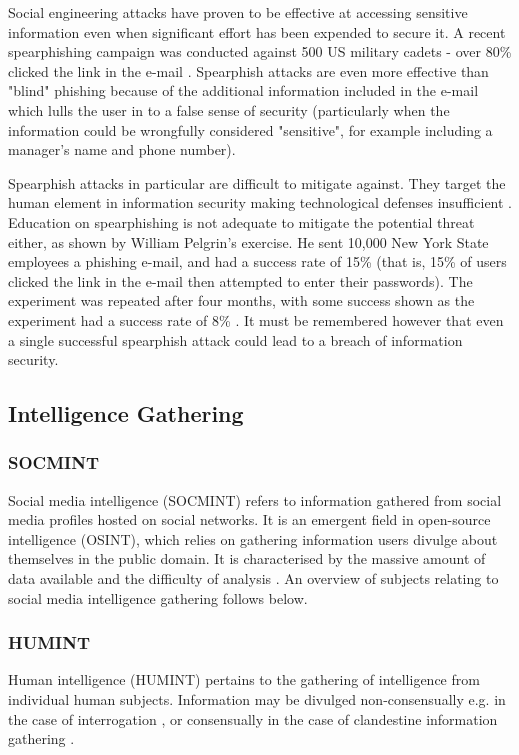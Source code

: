 \documentclass[12pt]{article}
\begin{document}
Social engineering attacks have proven to be effective at accessing sensitive information even when significant effort has been expended to secure it. A recent spearphishing campaign was conducted against 500 US military cadets - over 80\% clicked the link in the e-mail \citep{spearphishing}. Spearphish attacks are even more effective than "blind" phishing because of the additional information included in the e-mail which lulls the user in to a false sense of security (particularly when the information could be wrongfully considered "sensitive", for example including a manager's name and phone number).

Spearphish attacks in particular are difficult to mitigate against. They target the human element in information security making technological defenses insufficient \citep{spearphishing}. Education on spearphishing is not adequate to mitigate the potential threat either, as shown by William Pelgrin's exercise. He sent 10,000 New York State employees a phishing e-mail, and had a success rate of 15\% (that is, 15\% of users clicked the link in the e-mail then attempted to enter their passwords). The experiment was repeated after four months, with some success shown as the experiment had a success rate of 8\% \citep{spearphishingresults}. It must be remembered however that even a single successful spearphish attack could lead to a breach of information security.

\subsection{Intelligence Gathering}
\subsubsection{SOCMINT}
Social media intelligence (SOCMINT) refers to information gathered from social media profiles hosted on social networks. It is an emergent field in open-source intelligence (OSINT), which relies on gathering information users divulge about themselves in the public domain. It is characterised by the massive amount of data available \citep{socmintoverview} and the difficulty of analysis \citep{socmintlitreview}. An overview of subjects relating to social media intelligence gathering follows below.

\subsubsection{HUMINT}
Human intelligence (HUMINT) pertains to the gathering of intelligence from individual human subjects. Information may be divulged non-consensually e.g. in the case of interrogation \citep{criminalvshumint}, or consensually in the case of clandestine information gathering \citep{clandestinehumint}. 
\end{document}

